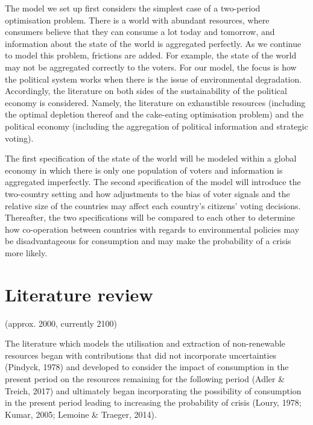 \documentclass[11pt,preprint, authoryear]{elsarticle}
\numberwithin{equation}{section}
\numberwithin{figure}{section}
\numberwithin{table}{section}
\begin{document}
The model we set up first considers the simplest case of a two-period
optimisation problem. There is a world with abundant resources, where
consumers believe that they can consume a lot today and tomorrow, and
information about the state of the world is aggregated perfectly. As we
continue to model this problem, frictions are added. For example, the
state of the world may not be aggregated correctly to the voters. For
our model, the focus is how the political system works when there is the
issue of environmental degradation. Accordingly, the literature on both
sides of the sustainability of the political economy is considered.
Namely, the literature on exhaustible resources (including the optimal
depletion thereof and the cake-eating optimisation problem) and the
political economy (including the aggregation of political information
and strategic voting).

The first specification of the state of the world will be modeled within
a global economy in which there is only one population of voters and
information is aggregated imperfectly. The second specification of the
model will introduce the two-country setting and how adjustments to the
bias of voter signals and the relative size of the countries may affect
each country's citizens' voting decisions. Thereafter, the two
specifications will be compared to each other to determine how
co-operation between countries with regards to environmental policies
may be disadvantageous for consumption and may make the probability of a
crisis more likely.

\hypertarget{literature-review}{%
\section{Literature review}\label{literature-review}}

(approx. 2000, currently 2100)

The literature which models the utilisation and extraction of
non-renewable resources began with contributions that did not
incorporate uncertainties (Pindyck, 1978) and developed to consider the
impact of consumption in the present period on the resources remaining
for the following period (Adler \& Treich, 2017) and ultimately began
incorporating the possibility of consumption in the present period
leading to increasing the probability of crisis (Loury, 1978; Kumar,
2005; Lemoine \& Traeger, 2014).
\end{document}
